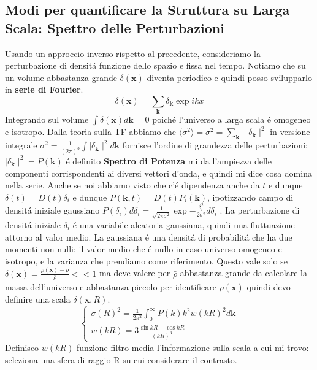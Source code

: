 \documentclass[12pt, a4paper]{article}
\begin{document}
\subsection{Modi per quantificare la Struttura su Larga Scala: Spettro delle Perturbazioni}
Usando un approccio inverso rispetto al precedente, consideriamo la perturbazione di densit\'{a} funzione dello spazio e fissa nel tempo. Notiamo che su un volume abbastanza grande $\delta(\textbf{x})$ diventa periodico e quindi posso svilupparlo in \textbf{serie di Fourier}.
\begin{equation}
\delta(\textbf{x})=\sum_{\textbf{k}}\delta_{\textbf{k}}\exp{ikx}
\end{equation}
Integrando sul volume $\int \delta(\textbf{x})d\textbf{k}=0$ poich\'{e} l'universo a larga scala \'{e} omogeneo e isotropo. Dalla teoria sulla TF abbiamo che $\langle \sigma^2 \rangle =\sigma^2=\sum_{\textbf{k}} \mid \delta_{\textbf{k}}\mid^2$ in versione integrale $\sigma^2= \frac{1}{(2\pi)^3}\int \mid \delta_{\textbf{k}}\mid^2 d\textbf{k}$  fornisce l'ordine di grandezza delle perturbazioni; $\mid \delta_{\textbf{k}}\mid^2=P(\textbf{k})$ \'{e} definito \textbf{Spettro di Potenza} mi da l'ampiezza delle componenti corrispondenti ai diversi vettori d'onda, e quindi mi dice cosa domina nella serie. Anche se noi abbiamo visto che c'\'{e} dipendenza anche da $t$ e dunque $\delta(t)=D(t) \delta_i$ e dunque $P(\textbf{k},t)=D(t)P_i(\textbf{k})$, ipotizzando campo di densit\'{a} iniziale gaussiano $P(\delta_i) d\delta_i=\frac{1}{\sqrt{2\pi \sigma^2}}\exp{-\frac{\delta_i^2}{2\sigma^2}}d\delta_i$ . La perturbazione di densit\'{a} iniziale $\delta_i$ \'{e} una variabile aleatoria gaussiana, quindi una fluttuazione attorno al valor medio. La gaussiana \'{e} una densit\'{a} di probabilit\'{a} che ha due momenti non nulli: il valor medio che \'{e} nullo in caso universo omogeneo e isotropo, e la varianza che prendiamo come riferimento.  Questo vale solo se $\delta(\textbf{x})=\frac{\rho(\textbf{x})-\bar{\rho}}{\bar{\rho}}<<1$ ma deve valere per $\bar{\rho}$ abbastanza grande da calcolare la massa dell'universo e abbastanza piccolo per identificare $\rho(\textbf{x})$ quindi devo definire una scala $\delta (\textbf{x}, R)$. 
\begin{equation}
\begin{cases}
\sigma(R)^2= \frac{1}{2\pi^2}\int_0^{\infty} P(k) k^2 w(kR)^2 d\textbf{k}
\\
w(kR)=3\frac{\sin{kR}-\cos{kR}}{(kR)^3}
\end{cases}
\end{equation}
Definisco $w(kR)$ funzione filtro media l'informazione sulla scala a cui mi trovo: seleziona una sfera di raggio R su cui considerare il contrasto.
\end{document}
